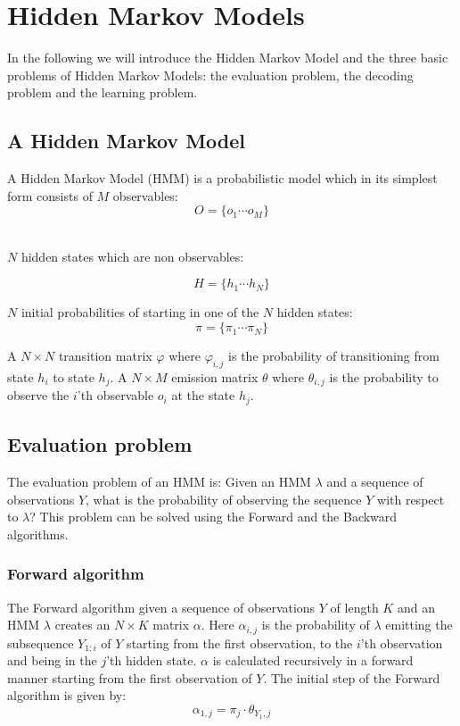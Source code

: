 \section{Hidden Markov Models}\label{sec:HMM}

In the following we will introduce the Hidden Markov Model and the three basic problems of Hidden Markov Models: the evaluation problem, the decoding problem and the learning problem.

\subsection{A Hidden Markov Model}

A Hidden Markov Model (HMM) is a probabilistic model which in its simplest form consists of $M$ observables:
$$O = \{o_1\cdots o_M\}$$\

$N$ hidden states which are non observables:


$$H= \{h_1\cdots h_N\}$$

$N$ initial probabilities of starting in one of the $N$ hidden states:
$$\pi = \{\pi_1\cdots\pi_N\}$$

A $ N \times N $ transition matrix $\varphi$ where $\varphi_{i,j}$ is the probability of transitioning from state $h_i$ to state $h_j$. A $ N \times M $ emission matrix $\theta$ where $\theta_{i,j}$ is the probability to observe the $i$'th observable $o_i$ at the state $h_j$. 

\subsection{Evaluation problem}

The evaluation problem of an HMM is: Given an HMM $\lambda$ and a sequence of observations $Y$, what is the probability of observing the sequence $Y$ with respect to $\lambda$? This problem can be solved using the Forward and the Backward algorithms.

\subsubsection{Forward algorithm}\label{sec:forward}

The Forward algorithm\cite{Bishop} given a sequence of observations $Y$ of length $K$ and an HMM $\lambda$ creates an $ N \times K$ matrix $\alpha$. Here $\alpha_{i,j}$ is the probability of $\lambda$ emitting the subsequence $Y_{1:i}$ of $Y$ starting from the first observation, to the $i$'th observation and being in the $j$'th hidden state. $\alpha$ is calculated recursively in a forward manner starting from the first observation of $Y$. 
The initial step of the Forward algorithm is given by:
$$\alpha_{1,j} = \pi_j\cdot\theta_{Y_1,j}$$

